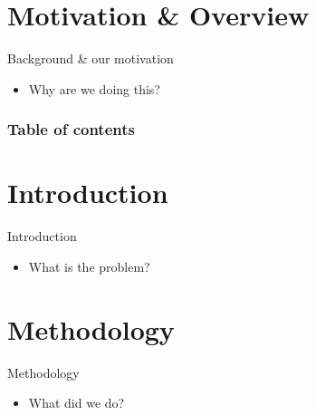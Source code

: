 \documentclass[compress,aspectratio=169]{beamer}
\title{\presentationtitle}
\subtitle{\presentationsubtitle}
\date{\presentationdate}
\author{\presentingauthor}
\institute{\labname}
\begin{document}
\maketitle

\section*{Motivation \& Overview}

\begin{frame}{Background \& our motivation}
	\begin{itemize}
		\item Why are we doing this? \cite{example}
	\end{itemize}

\end{frame}

\begin{frame}
	\frametitle{Table of contents}
	\tableofcontents
\end{frame}

\section{Introduction}

\begin{frame}{Introduction}
	\begin{itemize}
		\item What is the problem?
	\end{itemize}

\end{frame}

\section{Methodology}

\begin{frame}{Methodology}
	\begin{itemize}
		\item What did we do?
	\end{itemize}

\end{frame}
\end{document}
